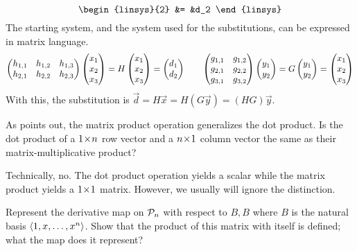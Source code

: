 \begin{exercises}
\begin{answer}
\begin{equation*}
\begin{linsys}{2}
               &=  &d_2
         \end{linsys}
      \end{equation*}
      The starting system, and the system used for the substitutions,
      can be expressed in matrix language.
      \begin{equation*}
        \begin{pmatrix}
          h_{1,1}  &h_{1,2}  &h_{1,3}  \\
          h_{2,1}  &h_{2,2}  &h_{2,3}
        \end{pmatrix}
        \begin{pmatrix} x_1 \\ x_2 \\ x_3 \end{pmatrix}
        =H\begin{pmatrix} x_1 \\ x_2 \\ x_3 \end{pmatrix}=\begin{pmatrix} d_1 \\ d_2 \end{pmatrix}
        \qquad
        \begin{pmatrix}
          g_{1,1}  &g_{1,2}  \\
          g_{2,1}  &g_{2,2}  \\
          g_{3,1}  &g_{3,2}
        \end{pmatrix}
        \begin{pmatrix} y_1 \\ y_2 \end{pmatrix}
        =G\begin{pmatrix} y_1 \\ y_2 \end{pmatrix}=\begin{pmatrix} x_1 \\ x_2 \\ x_3 \end{pmatrix}
      \end{equation*}
      With this, the substitution is 
      $\vec{d}=H\vec{x}=H(G\vec{y})=(HG)\vec{y}$.
    \end{answer}
  \item 
    As  points out, the matrix product
    operation generalizes the dot product.
    Is the dot product of a \( 1 \! \times \! n \) row vector
    and a \( n \! \times \! 1 \) column vector the same as their 
    matrix-multiplicative product?
    \begin{answer}
      Technically, no.
      The dot product operation yields a scalar while the matrix product
      yields a $1 \! \times \! 1$ matrix.
      However, we usually will ignore the distinction.
    \end{answer}
  \recommended \item 
    Represent the derivative map on \( \mathcal{P}_n \)
    with respect to \( B,B \) where \( B \) is the natural basis
    \( \langle1,x,\ldots,x^n\rangle \).
    Show that the product of this matrix with itself is defined;
    what the map does it represent?
    \begin{answer}

\end{answer}
\end{exercises}
